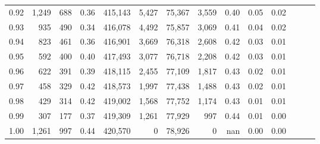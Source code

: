 \begin{tabular}{rrrrrrrrrrrrrr}
0.92 &  1,249 &    688 &  0.36 &  415,143 &    5,427 &  75,367 &   3,559 &  0.40 &  0.05 &      0.02 \\
0.93 &    935 &    490 &  0.34 &  416,078 &    4,492 &  75,857 &   3,069 &  0.41 &  0.04 &      0.02 \\
0.94 &    823 &    461 &  0.36 &  416,901 &    3,669 &  76,318 &   2,608 &  0.42 &  0.03 &      0.01 \\
0.95 &    592 &    400 &  0.40 &  417,493 &    3,077 &  76,718 &   2,208 &  0.42 &  0.03 &      0.01 \\
0.96 &    622 &    391 &  0.39 &  418,115 &    2,455 &  77,109 &   1,817 &  0.43 &  0.02 &      0.01 \\
0.97 &    458 &    329 &  0.42 &  418,573 &    1,997 &  77,438 &   1,488 &  0.43 &  0.02 &      0.01 \\
0.98 &    429 &    314 &  0.42 &  419,002 &    1,568 &  77,752 &   1,174 &  0.43 &  0.01 &      0.01 \\
0.99 &    307 &    177 &  0.37 &  419,309 &    1,261 &  77,929 &     997 &  0.44 &  0.01 &      0.00 \\
1.00 &  1,261 &    997 &  0.44 &  420,570 &        0 &  78,926 &       0 &   nan &  0.00 &      0.00 \\
\bottomrule
\end{tabular}
